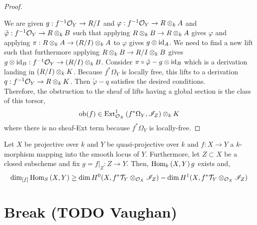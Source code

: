 \documentclass[12pt]{article}
\newcommand{\ob}{\mathrm{ob}}
\begin{document}
\begin{proof}
\begin{center}
\end{center}
We are given $g : f^{-1} \mathcal{O}_{Y} \to R/I$ and $\varphi : f^{-1} \mathcal{O}_{Y} \to R \otimes_k A$ and $\tilde{\varphi} : f^{-1} \mathcal{O}_{Y} \to R \otimes_k B$ such that applying $R \otimes_k B \to R \otimes_k A$ gives $\varphi$ and applying $\pi : R \otimes_k A \to (R/I) \otimes_k A$ to $\varphi$ gives $g \otimes \mathrm{id}_A$. We need to find a new lift such that furthermore applying $R \otimes_k B \to R/I \otimes_k B$ gives $g \otimes \mathrm{id}_B : f^{-1} \mathcal{O}_{Y} \to (R/I) \otimes_k B$. Consider $\pi \circ \tilde{\varphi} - g \otimes \mathrm{id}_B$ which is a derivation landing in $(R/I) \otimes_k K$. Because $f^* \Omega_Y$ is locally free, this lifts to a derivation $q : f^{-1} \mathcal{O}_{Y} \to R \otimes_k K$. Then $\tilde{\varphi} - q$ satisfies the desired conditions.
\bigskip\\
Therefore, the obstruction to the sheaf of lifts having a global section is the class of this torsor,
\[ \ob(f) \in \Ext{1}{\struct{X}}{f^* \Omega_Y}{\I_Z} \ot_k K \]
where there is no sheaf-Ext term because $f^* \Omega_Y$ is locally-free.
\end{proof}

\begin{cor}
Let $X$ be projective over $k$ and $Y$ be quasi-projective over $k$ and $f : X \to Y$ a $k$-morphism mapping into the smooth locus of $Y$. Furthermore, let $Z \subset X$ be a closed subscheme and fix $g = f|_Z : Z \to Y$. Then, $\mathrm{Hom}_{k} \left( X, Y \right){g}$ exists and,
\[ \dim_{[f]} \mathrm{Hom}_{S} \left( X, Y \right) \ge \dim H^0(X, f^* \mathcal{T}_Y \otimes_{\mathcal{O}_{X}} \mathscr{I}_Z) - \dim H^1(X, f^* \mathcal{T}_Y \otimes_{\mathcal{O}_{X}} \mathscr{I}_Z) \]
\end{cor}


\section{Break (TODO Vaughan)}
\end{document}

